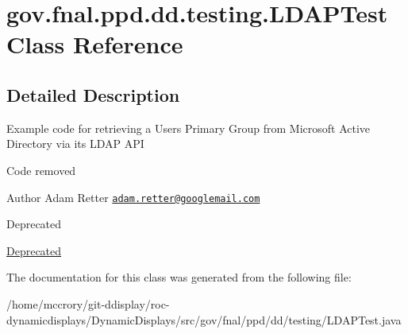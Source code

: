 \hypertarget{classgov_1_1fnal_1_1ppd_1_1dd_1_1testing_1_1LDAPTest}{\section{gov.\-fnal.\-ppd.\-dd.\-testing.\-L\-D\-A\-P\-Test Class Reference}
\label{classgov_1_1fnal_1_1ppd_1_1dd_1_1testing_1_1LDAPTest}
}


\subsection{Detailed Description}
Example code for retrieving a Users Primary Group from Microsoft Active Directory via its L\-D\-A\-P A\-P\-I

Code removed

\begin{DoxyAuthor}{Author}
Adam Retter \href{mailto:adam.retter@googlemail.com}{\tt adam.\-retter@googlemail.\-com} 
\end{DoxyAuthor}
\begin{DoxyRefDesc}{Deprecated}
\item[\hyperlink{deprecated__deprecated000008}{Deprecated}]\end{DoxyRefDesc}


The documentation for this class was generated from the following file\-:\begin{DoxyCompactItemize}
\item 
/home/mccrory/git-\/ddisplay/roc-\/dynamicdisplays/\-Dynamic\-Displays/src/gov/fnal/ppd/dd/testing/L\-D\-A\-P\-Test.\-java\end{DoxyCompactItemize}
